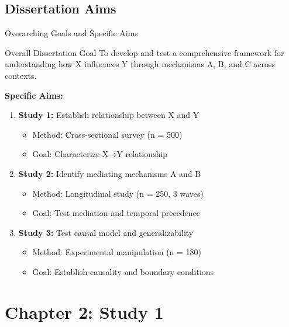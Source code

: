 \documentclass[aspectratio=169,12pt]{beamer}
\begin{document}
\subsection{Dissertation Aims}

\begin{frame}{Overarching Goals and Specific Aims}
  \begin{block}{Overall Dissertation Goal}
    To develop and test a comprehensive framework for understanding how X influences Y through mechanisms A, B, and C across contexts.
  \end{block}
  
  \vspace{0.5cm}
  
  \textbf{Specific Aims:}
  
  \begin{enumerate}
    \item \textbf{Study 1:} Establish relationship between X and Y
    \begin{itemize}
      \item Method: Cross-sectional survey (n = 500)
      \item Goal: Characterize X→Y relationship
    \end{itemize}
    
    \item \textbf{Study 2:} Identify mediating mechanisms A and B
    \begin{itemize}
      \item Method: Longitudinal study (n = 250, 3 waves)
      \item Goal: Test mediation and temporal precedence
    \end{itemize}
    
    \item \textbf{Study 3:} Test causal model and generalizability
    \begin{itemize}
      \item Method: Experimental manipulation (n = 180)
      \item Goal: Establish causality and boundary conditions
    \end{itemize}
  \end{enumerate}
\end{frame}


\section{Chapter 2: Study 1}
\end{document}
